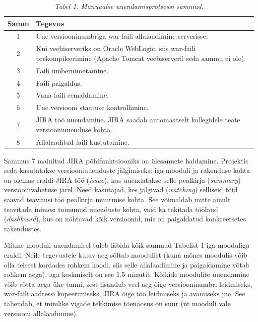 \documentclass[12pt]{article}
\begin{document}
  \begin{table}[H]
    \caption*{\textit{Tabel 1. Manuaalse uuendamisprotsessi sammud.}}
  
    \begin{tabular}{ |c|p{11cm}| }
      \hline
      \textbf{Samm} & \textbf{Tegevus}\\
      \hline
      1 & Uue versiooninumbriga war\--faili allalaadimine serverisse.\\
      \hline
      2 & Kui veebiserveriks on Oracle WebLogic, siis war\--faili prekompileerimine (Apache Tomcat veebiserveril seda sammu ei ole).\\
      \hline
      3 & Faili ümbernimetamine.\\
      \hline
      4 & Faili paigaldus.\\
      \hline
      5 & Vana faili eemaldamine.\\
      \hline
      6 & Uue versiooni staatuse kontrollimine.\\
      \hline
      7 & JIRA\footnotemark{} töö uuendamine. JIRA saadab automaatselt kollegidele teate versiooniuuenduse kohta.\\
      \hline
      8 & Allalaaditud faili kustutamine.\\
      \hline
    \end{tabular}
  \end{table}
  
  
  Sammus 7 mainitud JIRA põhifunktsiooniks on ülesannete haldamine. Projektis seda kasutatakse versiooniuuenduste jälgimiseks: iga mooduli ja rakenduse kohta on olemas eraldi JIRA töö (\textit{issue}), kus uuendatakse selle pealkirja (\textit{summary}) versioonivahetuse järel. Need kasutajad, kes jälgivad (\textit{watching}) selliseid töid saavad teavitusi töö pealkirja muutmise kohta. See võimaldab mitte ainult teavitada inimesi toimunud uuenduste kohta, vaid ka tekitada töölaud (\textit{dashboard}), kus on nähtavad kõik versioonid, mis on paigaldatud konkreetsetes rakendustes.
  
  Mitme mooduli uuendamisel tuleb läbida kõik sammud Tabelist 1 iga mooduliga eraldi. Neile tegevustele kuluv aeg sõltub moodulist (kuna mõnes moodulis võib olla teisest kordades rohkem koodi, siis selle allalaadimine ja paigaldamine võtab rohkem aega), aga keskmiselt on see 1.5 minutit. Kõikide moodulite uuendamine võib võtta aega ühe tunni, sest lisandub veel aeg õige versiooninumbri leidmiseks, war\--faili aadressi kopeerimiseks, JIRA õige töö leidmiseks ja avamiseks jne. See tähendab, et inimlike vigade tekkimise tõenäosus on suur (nt mooduli vale versiooni allalaadimine).
  
\end{document}
